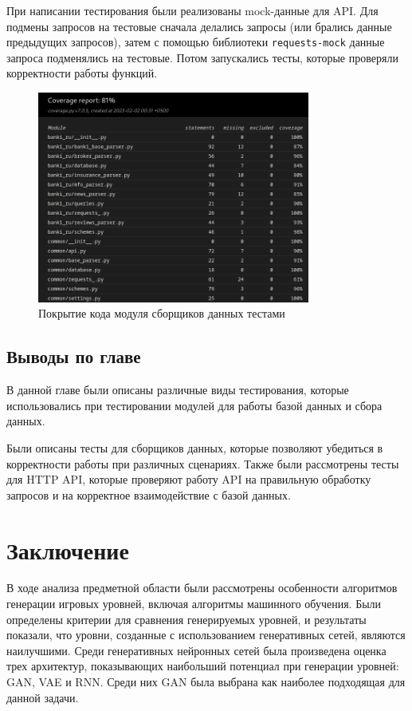 \documentclass[PI, VKR]{HSEUniversity}
\begin{document}
При написании тестирования были реализованы mock-данные для API. Для подмены запросов на тестовые сначала делались запросы (или брались данные предыдущих запросов), затем с помощью библиотеки \texttt{requests-mock} данные запроса подменялись на тестовые. Потом запускались тесты, которые проверяли корректности работы функций.

\begin{figure}[h]
\centering
\includegraphics[width=0.8\textwidth]{img/parser_coverage.png}
\caption{\label{fig:parser_coverage}Покрытие кода модуля сборщиков данных тестами}
\end{figure}
\section{Выводы по главе}
\label{sec:org0fd20e6}
В данной главе были описаны различные виды тестирования, которые использовались при тестировании модулей для работы базой данных и сбора данных.

Были описаны тесты для сборщиков данных, которые позволяют убедиться в корректности работы при различных сценариях. Также были рассмотрены тесты для HTTP API, которые проверяют работу API на правильную обработку запросов и на корректное взаимодействие с базой данных.
\chapter*{Заключение}
\label{sec:orgb92e190}
В ходе анализа предметной области были рассмотрены особенности алгоритмов генерации игровых уровней, включая алгоритмы машинного обучения. Были определены критерии для сравнения генерируемых уровней, и результаты показали, что уровни, созданные с использованием генеративных сетей, являются наилучшими. Среди генеративных нейронных сетей была произведена оценка трех архитектур, показывающих наибольший потенциал при генерации уровней: GAN, VAE и RNN. Среди них GAN была выбрана как наиболее подходящая для данной задачи.
\end{document}
